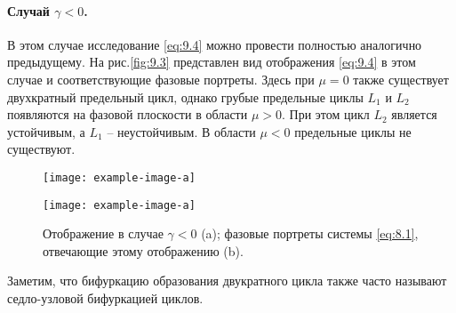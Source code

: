\paragraph{Случай $\gamma<0$.}%
В этом случае исследование \eqref{eq:9.4} можно провести полностью аналогично 
предыдущему. На рис.\ref{fig:9.3} представлен вид
отображения \eqref{eq:9.4} в этом случае и соответствующие фазовые портреты. 
Здесь при $\mu=0$ также существует двухкратный предельный цикл, однако грубые 
предельные циклы $L_1$ и $L_2$ появляются на фазовой плоскости в области $\mu>0$.
При этом цикл $L_2$ является устойчивым, а $L_1$ -- неустойчивым. В области $\mu<0$ 
предельные циклы не существуют.

\begin{figure}[h]
        \centering
        \begin{minipage}{\linewidth}
            \centering
            \texttt{[image: example-image-a]}                
        \end{minipage}
        \hfill
        \begin{minipage}{\linewidth}
            \centering
            \texttt{[image: example-image-a]} 
        \end{minipage}
        \caption{Отображение в случае $\gamma<0$ (a); фазовые портреты системы \eqref{eq:8.1},
        отвечающие этому отображению (b).}
        \label{fig:9.2}
\end{figure}

Заметим, что бифуркацию образования двукратного цикла также часто называют седло-узловой бифуркацией
циклов.

